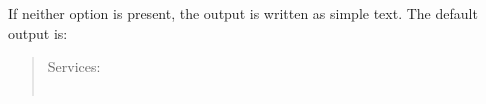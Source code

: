 If neither option is present, the output is written as simple text.
The default output is:
\begin{quote}

Services:\\
\\
%
%
%


\end{quote}
